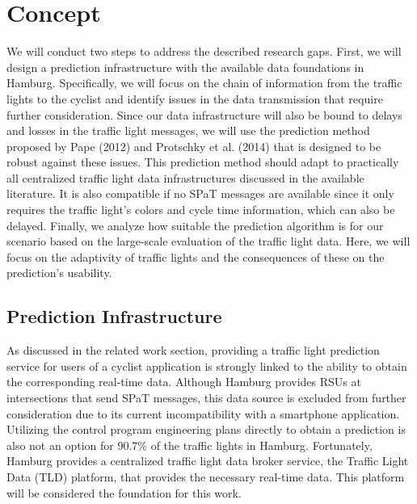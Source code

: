 \section{Concept}\label{sec:signal-prediction}

We will conduct two steps to address the described research gaps. First, we will design a prediction infrastructure with the available data foundations in Hamburg. Specifically, we will focus on the chain of information from the traffic lights to the cyclist and identify issues in the data transmission that require further consideration. Since our data infrastructure will also be bound to delays and losses in the traffic light messages, we will use the prediction method proposed by Pape (2012) \cite{pape_untersuchung_2012} and Protschky et al. (2014) \cite{protschky_extensive_2014, protschky_adaptive_2014} that is designed to be robust against these issues. This prediction method should adapt to practically all centralized traffic light data infrastructures discussed in the available literature. It is also compatible if no SPaT messages are available since it only requires the traffic light's colors and cycle time information, which can also be delayed. Finally, we analyze how suitable the prediction algorithm is for our scenario based on the large-scale evaluation of the traffic light data. Here, we will focus on the adaptivity of traffic lights and the consequences of these on the prediction's usability.

\subsection{Prediction Infrastructure}

As discussed in the related work section, providing a traffic light prediction service for users of a cyclist application is strongly linked to the ability to obtain the corresponding real-time data. Although Hamburg provides RSUs at intersections that send SPaT messages, this data source is excluded from further consideration due to its current incompatibility with a smartphone application. Utilizing the control program engineering plans directly to obtain a prediction is also not an option for 90.7\% of the traffic lights in Hamburg. Fortunately, Hamburg provides a centralized traffic light data broker service, the Traffic Light Data (TLD) platform, that provides the necessary real-time data. This platform will be considered the foundation for this work.

